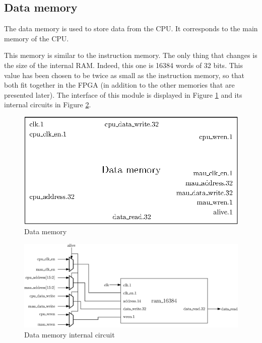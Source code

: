 \subsection{Data memory}

The data memory is used to store data from the CPU.  It corresponds to the main memory of the CPU.

This memory is similar to the instruction memory. The only 
thing that changes is the size of the internal RAM. Indeed, this one is 16384 words of 32 bits. This 
value has been chosen to be twice as small as the instruction memory, so that both fit together in 
the FPGA (in addition to the other memories that are presented later). The interface of this module
is displayed in Figure \ref{fig:components/dm} and its internal circuits in Figure \ref{fig:components/dm_in}.

\begin{figure}[H]
    \centering
    \includegraphics[scale=0.8]{Chapter3-CPU/res/data_memory}
    \caption{Data memory}
    \label{fig:components/dm}
\end{figure}

\begin{figure}[H]
    \centering
    \includegraphics[width=\linewidth]{Chapter3-CPU/res/data_memory_in}
    \caption{Data memory internal circuit}
    \label{fig:components/dm_in}
\end{figure}

